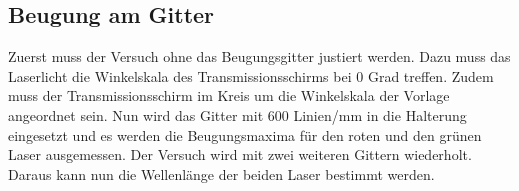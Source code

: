 \subsection{Beugung am Gitter}
Zuerst muss der Versuch ohne das Beugungsgitter justiert werden. Dazu muss das Laserlicht die Winkelskala des Transmissionsschirms bei 0 Grad treffen. Zudem muss der 
Transmissionsschirm im Kreis um die Winkelskala der Vorlage angeordnet sein. Nun wird das Gitter mit 600 Linien/mm in die Halterung eingesetzt und es werden die 
Beugungsmaxima für den roten und den grünen Laser ausgemessen. Der Versuch wird mit zwei weiteren Gittern wiederholt. Daraus kann nun die Wellenlänge der beiden Laser 
bestimmt werden.